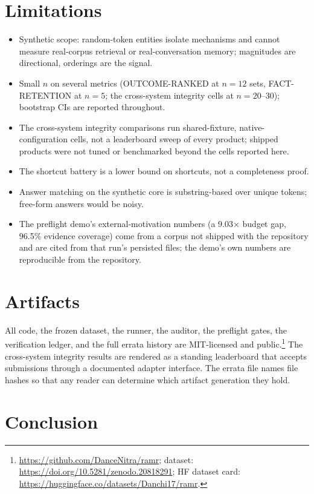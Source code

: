\documentclass[11pt]{article}
\begin{document}
\section{Limitations}

\begin{itemize}
\item Synthetic scope: random-token entities isolate mechanisms and cannot measure real-corpus
retrieval or real-conversation memory; magnitudes are directional, orderings are the signal.
\item Small $n$ on several metrics (OUTCOME-RANKED at $n{=}12$ sets, FACT-RETENTION at $n{=}5$; the
cross-system integrity cells at $n{=}20$--$30$); bootstrap CIs are reported throughout.
\item The cross-system integrity comparisons run shared-fixture, native-configuration cells, not a
leaderboard sweep of every product; shipped products were not tuned or benchmarked beyond the cells
reported here.
\item The shortcut battery is a lower bound on shortcuts, not a completeness proof.
\item Answer matching on the synthetic core is substring-based over unique tokens; free-form answers
would be noisy.
\item The preflight demo's external-motivation numbers (a 9.03$\times$ budget gap, 96.5\% evidence
coverage) come from a corpus not shipped with the repository and are cited from that run's persisted
files; the demo's own numbers are reproducible from the repository.
\end{itemize}

\section{Artifacts}

All code, the frozen dataset, the runner, the auditor, the preflight gates, the verification ledger,
and the full errata history are MIT-licensed and public.\footnote{\url{https://github.com/DanceNitra/ramr};
dataset: \url{https://doi.org/10.5281/zenodo.20818291}; HF dataset card:
\url{https://huggingface.co/datasets/Danchi17/ramr}.} The cross-system integrity results are rendered as a
standing leaderboard that accepts submissions through a documented adapter interface. The errata file
names file hashes so that any reader can determine which artifact generation they hold.

\section{Conclusion}
\end{document}
